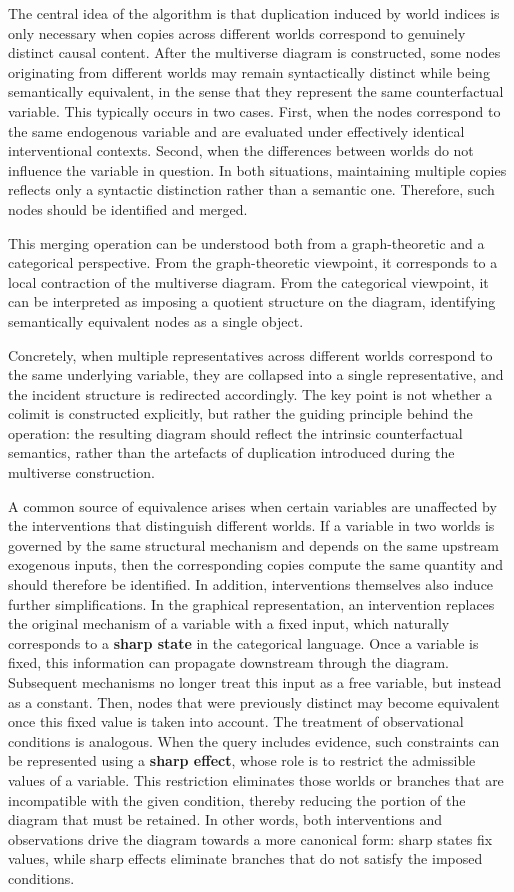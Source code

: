 \documentclass[a4paper]{report}
\begin{document}
The central idea of the algorithm is that duplication induced by world indices is only necessary when copies across different worlds correspond to genuinely distinct causal content. After the multiverse diagram is constructed, some nodes originating from different worlds may remain syntactically distinct while being semantically equivalent, in the sense that they represent the same counterfactual variable. This typically occurs in two cases. First, when the nodes correspond to the same endogenous variable and are evaluated under effectively identical interventional contexts. Second, when the differences between worlds do not influence the variable in question. In both situations, maintaining multiple copies reflects only a syntactic distinction rather than a semantic one. Therefore, such nodes should be identified and merged.

This merging operation can be understood both from a graph-theoretic and a categorical perspective. From the graph-theoretic viewpoint, it corresponds to a local contraction of the multiverse diagram. From the categorical viewpoint, it can be interpreted as imposing a quotient structure on the diagram, identifying semantically equivalent nodes as a single object.

Concretely, when multiple representatives across different worlds correspond to the same underlying variable, they are collapsed into a single representative, and the incident structure is redirected accordingly. The key point is not whether a colimit is constructed explicitly, but rather the guiding principle behind the operation: the resulting diagram should reflect the intrinsic counterfactual semantics, rather than the artefacts of duplication introduced during the multiverse construction.

A common source of equivalence arises when certain variables are unaffected by the interventions that distinguish different worlds. If a variable in two worlds is governed by the same structural mechanism and depends on the same upstream exogenous inputs, then the corresponding copies compute the same quantity and should therefore be identified. In addition, interventions themselves also induce further simplifications. In the graphical representation, an intervention replaces the original mechanism of a variable with a fixed input, which naturally corresponds to a \textbf{sharp state} in the categorical language. Once a variable is fixed, this information can propagate downstream through the diagram. Subsequent mechanisms no longer treat this input as a free variable, but instead as a constant. Then, nodes that were previously distinct may become equivalent once this fixed value is taken into account. The treatment of observational conditions is analogous. When the query includes evidence, such constraints can be represented using a \textbf{sharp effect}, whose role is to restrict the admissible values of a variable. This restriction eliminates those worlds or branches that are incompatible with the given condition, thereby reducing the portion of the diagram that must be retained. In other words, both interventions and observations drive the diagram towards a more canonical form: sharp states fix values, while sharp effects eliminate branches that do not satisfy the imposed conditions.
\end{document}
